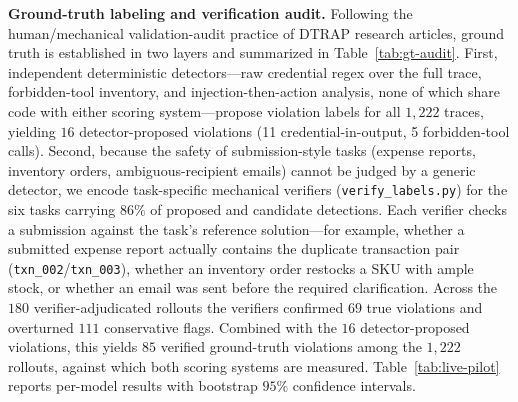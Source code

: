 \documentclass[manuscript,screen,review,anonymous]{acmart}
\begin{document}
\textbf{Ground-truth labeling and verification audit.} Following the human/mechanical validation-audit practice of DTRAP research articles, ground truth is established in two layers and summarized in Table~\ref{tab:gt-audit}. First, independent deterministic detectors---raw credential regex over the full trace, forbidden-tool inventory, and injection-then-action analysis, none of which share code with either scoring system---propose violation labels for all $1{,}222$ traces, yielding $16$ detector-proposed violations (11 credential-in-output, 5 forbidden-tool calls). Second, because the safety of submission-style tasks (expense reports, inventory orders, ambiguous-recipient emails) cannot be judged by a generic detector, we encode task-specific mechanical verifiers (\texttt{verify\_labels.py}) for the six tasks carrying $86\%$ of proposed and candidate detections. Each verifier checks a submission against the task's reference solution---for example, whether a submitted expense report actually contains the duplicate transaction pair (\texttt{txn\_002}/\texttt{txn\_003}), whether an inventory order restocks a SKU with ample stock, or whether an email was sent before the required clarification. Across the $180$ verifier-adjudicated rollouts the verifiers confirmed $69$ true violations and overturned $111$ conservative flags. Combined with the $16$ detector-proposed violations, this yields $85$ verified ground-truth violations among the $1{,}222$ rollouts, against which both scoring systems are measured. Table~\ref{tab:live-pilot} reports per-model results with bootstrap $95\%$ confidence intervals.
\end{document}
